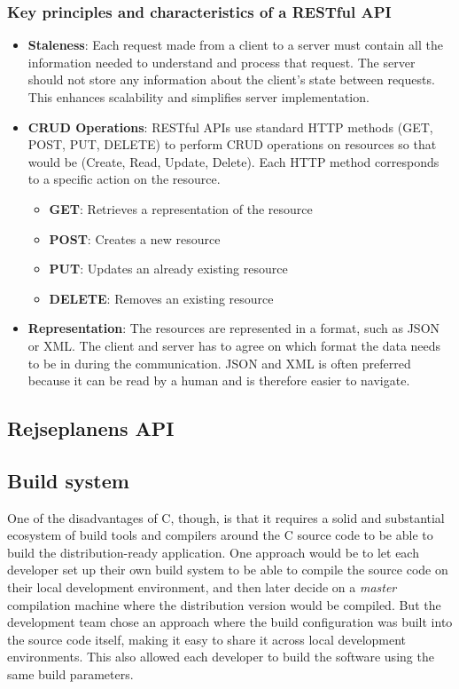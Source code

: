 \subsubsection{Key principles and characteristics of a RESTful API}
\label{subsubsec:key-principles-and-characteristics-of-a-restful-api}
\begin{itemize}
    \item \textbf{Staleness}: Each request made from a client to a server must contain all the information needed to
    understand and process that request.
    The server should not store any information about the client's state between requests.
    This enhances scalability and simplifies server implementation.
    \item \textbf{CRUD Operations}: RESTful APIs use standard HTTP methods (GET, POST, PUT, DELETE) to perform CRUD
    operations on resources so that would be (Create, Read, Update, Delete).
    Each HTTP method corresponds to a specific action on the resource.
    \begin{itemize}
        \item \textbf{GET}: Retrieves a representation of the resource
        \item \textbf{POST}: Creates a new resource
        \item \textbf{PUT}: Updates an already existing resource
        \item \textbf{DELETE}: Removes an existing resource
    \end{itemize}
    \item \textbf{Representation}: The resources are represented in a format, such as JSON or XML.
    The client and server has to agree on which format the data needs to be in during the communication.
    JSON and XML is often preferred because it can be read by a human and is therefore easier to navigate.
\end{itemize}

\subsection{Rejseplanens API}\label{subsec:rejseplanens-api}

\subsection{Build system}\label{subsec:build-system}

One of the disadvantages of C, though, is that it requires a solid and substantial ecosystem of build tools and
compilers around the C source code to be able to build the distribution-ready application.
One approach would be to let each developer set up their own build system to be able to compile the source code on their
local development environment, and then later decide on a \textit{master} compilation machine where the distribution
version would be compiled.
But the development team chose an approach where the build configuration was built into the source code itself, making
it easy to share it across local development environments.
This also allowed each developer to build the software using the same build parameters.

